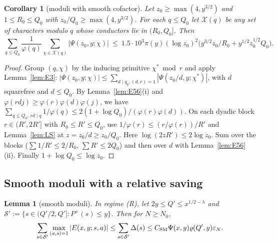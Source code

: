 \documentclass[11pt]{amsart}
\newtheorem{lemma}[theorem]{Lemma}
\newtheorem{corollary}[theorem]{Corollary}
\theoremstyle{definition}
\newcommand{\cS}{\mathcal{S}}
\newcommand{\Pp}{P^{+}}
\begin{document}
\begin{corollary}[moduli with smooth cofactor]\label{cor:LS}
Let $z_0\ge\max(4,y^{3/2})$ and $1\le R_0\le Q_0$ with $z_0/Q_0\ge\max(4,y^{3/2})$. For each $q\le Q_0$ let $\mathcal X(q)$ be any set of
characters modulo $q$ whose conductors lie in $(R_0,Q_0]$. Then
\[
\sum_{q\le Q_0}\frac1{\varphi(q)}\sum_{\chi\in\mathcal X(q)}|\Psi(z_0,y;\chi)|\ \le\ 1.5\cdot10^3\pi(y)(\log z_0)^2\bigl(y^{3/2}z_0/R_0+y^{1/2}z_0^{1/2}Q_0\bigr).
\]
\end{corollary}

\begin{proof}
Group $(q,\chi)$ by the inducing primitive $\chi^*\bmod r$ and apply Lemma~\ref{lem:E3}: $|\Psi(z_0,y;\chi)|\le\sum_{d\mid q_y,(d,r)=1}|\Psi(z_0/d,y;\chi^*)|$,
with $d$ squarefree and $d\le Q_0$. By Lemma~\ref{lem:E56}(i) and $\varphi(rdj)\ge\varphi(r)\varphi(d)\varphi(j)$, we have
$\sum_{q\le Q_0,\,rd\mid q}1/\varphi(q)\le2(1+\log Q_0)/(\varphi(r)\varphi(d))$. On each dyadic block $r\in(R',2R']$ with $R_0\le R'\le Q_0$, use
$1/\varphi(r)\le(r/\varphi(r))/R'$ and Lemma~\ref{lem:LS} at $z=z_0/d\ge z_0/Q_0$. Here $\log(2zR')\le2\log z_0$. Sum over the blocks
($\sum1/R'\le2/R_0$, $\sum R'\le2Q_0$) and then over $d$ with Lemma~\ref{lem:E56}(ii). Finally $1+\log Q_0\le\log z_0$.
\end{proof}

\subsection{Smooth moduli with a relative saving}

\begin{lemma}[smooth moduli]\label{lem:SM}
In regime (R), let $2y\le Q'\le x^{1/2-\lambda}$ and $\cS':=\{s\in(Q'/2,Q']:\Pp(s)\le y\}$. Then for $N\ge N_0$,
\[
\sum_{s\in\cS'}\max_{(a,s)=1}|E(x,y;s,a)|\le\sum_{s\in\cS'}\Delta(s)\le C_{\rm SM}\Psi(x,y)\varrho(Q',y)\varepsilon_N .
\]
\end{lemma}
\end{document}
